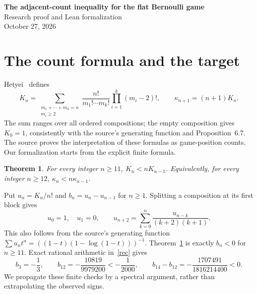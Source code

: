 \documentclass[11pt]{article}
\newtheorem{theorem}{Theorem}
\begin{document}
\begin{center}
{\Large\bfseries The adjacent-count inequality for the flat Bernoulli game}\\[.5em]
Research proof and Lean formalization\\
October 27, 2026
\end{center}
\begin{abstract}
We prove the adjacent-count inequality in Hetyei's Conjecture~6.10.
After factorial normalization, the counting sequence is a renewal sequence
whose increments must be negative from index 11 onward. Finite symmetric
arrowhead matrices realize approximating moments. Their spectrum has one
negative value, and positive-weight power inequalities propagate three exact
coefficient checks to the entire tail. Classical finite power sums identify
the limiting coefficients. The Lean proof includes the source's finite
ordered-composition formula and all spectral, recurrence and limit bridges.
\end{abstract}

\section{The count formula and the target}
Hetyei~\cite[(16), Conjecture~6.10]{H} defines
\begin{equation}\label{counts}
 K_n=\sum_{\substack{m_1+\cdots+m_k=n\\m_i\ge2}}
       \frac{n!}{m_1!\cdots m_k!}\prod_{i=1}^k(m_i-2)!,
 \qquad \kappa_{n+1}=(n+1)K_n.
\end{equation}
The sum ranges over all ordered compositions; the empty composition gives
$K_0=1$, consistently with the source's generating function and
Proposition~6.7. The source proves the interpretation of these formulas as
game-position counts. Our formalization starts from the explicit finite formula.
\begin{theorem}\label{main}
For every integer $n\ge11$, $K_n<nK_{n-1}$. Equivalently, for every
integer $n\ge12$, $\kappa_n<n\kappa_{n-1}$.
\end{theorem}
Put $u_n=K_n/n!$ and $b_n=u_n-u_{n-1}$ for $n\ge1$.
Splitting a composition at its first block gives
\begin{equation}\label{rec}
 u_0=1,\quad u_1=0,\qquad
 u_{n+2}=\sum_{k=0}^{n}\frac{u_{n-k}}{(k+2)(k+1)}.
\end{equation}
This also follows from the source's generating function
$\sum u_nt^n=((1-t)(1-\log(1-t)))^{-1}$.
Theorem~\ref{main} is exactly $b_n<0$ for $n\ge11$.
Exact rational arithmetic in~\eqref{rec} gives
\begin{equation}\label{base}
 b_3=-\frac13,\qquad b_{12}=-\frac{10819}{9979200}<-\frac1{2000},
 \qquad b_{14}-b_{12}=-\frac{1707491}{1816214400}<0.
\end{equation}
We propagate these finite checks by a spectral argument, rather than
extrapolating the observed signs.
\end{document}
